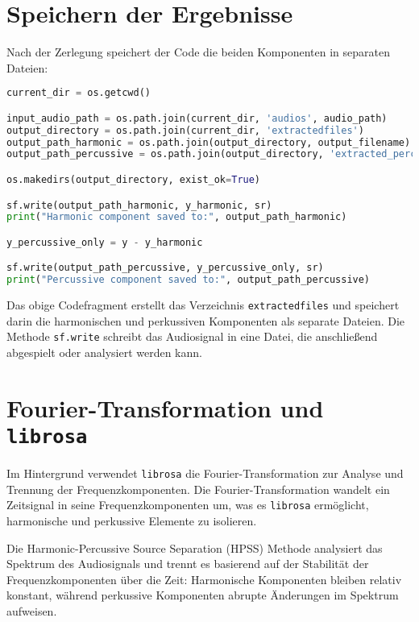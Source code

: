 \section{Speichern der Ergebnisse}

Nach der Zerlegung speichert der Code die beiden Komponenten in separaten Dateien:

\begin{lstlisting}[language=Python, caption={Speichern der Komponenten}]
current_dir = os.getcwd()

input_audio_path = os.path.join(current_dir, 'audios', audio_path)
output_directory = os.path.join(current_dir, 'extractedfiles')
output_path_harmonic = os.path.join(output_directory, output_filename)
output_path_percussive = os.path.join(output_directory, 'extracted_percussive.wav')

os.makedirs(output_directory, exist_ok=True)

sf.write(output_path_harmonic, y_harmonic, sr)
print("Harmonic component saved to:", output_path_harmonic)

y_percussive_only = y - y_harmonic

sf.write(output_path_percussive, y_percussive_only, sr)
print("Percussive component saved to:", output_path_percussive)
\end{lstlisting}

Das obige Codefragment erstellt das Verzeichnis \texttt{extractedfiles} und speichert darin die harmonischen und perkussiven Komponenten als separate Dateien. Die Methode \texttt{sf.write} schreibt das Audiosignal in eine Datei, die anschließend abgespielt oder analysiert werden kann.

\section{Fourier-Transformation und \texttt{librosa}}

Im Hintergrund verwendet \texttt{librosa} die Fourier-Transformation zur Analyse und Trennung der Frequenzkomponenten. Die Fourier-Transformation wandelt ein Zeitsignal in seine Frequenzkomponenten um, was es \texttt{librosa} ermöglicht, harmonische und perkussive Elemente zu isolieren.

Die Harmonic-Percussive Source Separation (HPSS) Methode analysiert das Spektrum des Audiosignals und trennt es basierend auf der Stabilität der Frequenzkomponenten über die Zeit: Harmonische Komponenten bleiben relativ konstant, während perkussive Komponenten abrupte Änderungen im Spektrum aufweisen.

